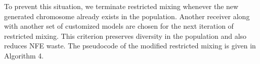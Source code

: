 \documentclass{sig-alternate-05-2015}
\begin{document}


To prevent this situation, we terminate restricted mixing whenever the new generated chromosome already exists in the population. Another receiver along with another set of customized models are chosen for the next iteration of restricted mixing. This criterion preserves diversity in the population and also reduces NFE waste. The pseudocode of the modified restricted mixing is given in Algorithm 4.
\end{document}
